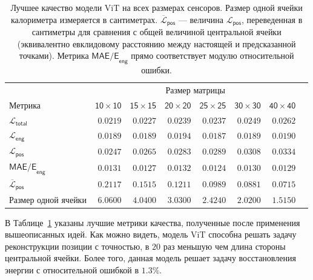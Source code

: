 \documentclass[a4paper,12pt]{extarticle}
\begin{document}
\begin{table}[t]
	\footnotesize
	\centering
	\begin{tabular}{lrrrrrrr}
		\toprule
		{} & \multicolumn{6}{c}{\textsf{Размер матрицы}} \\
		\cmidrule(lr){2-7}
		\textsf{Метрика} & $\mathsf{10 \times 10}$ &  $\mathsf{15 \times 15}$ &  $\mathsf{20 \times 20}$ &  $\mathsf{25 \times 25}$ &  $\mathsf{30 \times 30}$ &  $\mathsf{40 \times 40}$ \\
        \midrule
        $\mathcal{L}_{\mathsf{total}}$ & $\mathsf{0.0219}$ & $\mathsf{0.0227}$ & $\mathsf{0.0239}$ & $\mathsf{0.0237}$ & $\mathsf{0.0249}$ & $\mathsf{0.0262}$ \\
        $\mathcal{L}_{\mathsf{eng}}$ & $\mathsf{0.0189}$ & $\mathsf{0.0189}$ & $\mathsf{0.0194}$ & $\mathsf{0.0187}$ & $\mathsf{0.0189}$ & $\mathsf{0.0190}$ \\
        $\mathcal{L}_{\mathsf{pos}}$ & $\mathsf{0.0247}$ & $\mathsf{0.0265}$ & $\mathsf{0.0283}$ & $\mathsf{0.0289}$ & $\mathsf{0.0308}$ & $\mathsf{0.0334}$ \\
        $\textsf{MAE/E}_{\textsf{eng}}$ & $\mathsf{0.0131}$ & $\mathsf{0.0127}$ & $\mathsf{0.0132}$ & $\mathsf{0.0124}$ & $\mathsf{0.0130}$ & $\mathsf{0.0129}$ \\
        $\overline{\mathcal{L}}_{\mathsf{pos}}$ & $\mathsf{0.2117}$ & $\mathsf{0.1515}$ & $\mathsf{0.1211}$ & $\mathsf{0.0989}$ & $\mathsf{0.0881}$ & $\mathsf{0.0715}$ \\
        \textsf{Размер одной ячейки} & $\mathsf{6.0600}$ & $\mathsf{4.0400}$ & $\mathsf{3.0300}$ & $\mathsf{2.4240}$ & $\mathsf{2.0200}$ & $\mathsf{1.5150}$ \\           
        \bottomrule
	\end{tabular}
    \caption{Лучшее качество модели \textsf{ViT} на всех размерах сенсоров. Размер одной ячейки калориметра измеряется в сантиметрах. $\overline{\mathcal{L}}_{\mathsf{pos}}$ --- величина $\mathcal{L}_{\mathsf{pos}}$, переведенная в сантиметры для сравнения с общей величиной центральной ячейки (эквивалентно евклидовому расстоянию между настоящей и предсказанной точками). Метрика $\textsf{MAE/E}_{\textsf{eng}}$ прямо соответствует модулю относительной ошибки.}
	\label{table:best_results}
\end{table}

В Таблице~\ref{table:best_results} указаны лучшие метрики качества, полученные после применения вышеописанных идей. Как можно видеть, модель \textsf{ViT} способна решать задачу реконструкции позиции с точностью, в $20$ раз меньшую чем длина стороны центральной ячейки. Более того, данная модель решает задачу восстановления энергии с относительной ошибкой в $1.3\%$.
\end{document}
